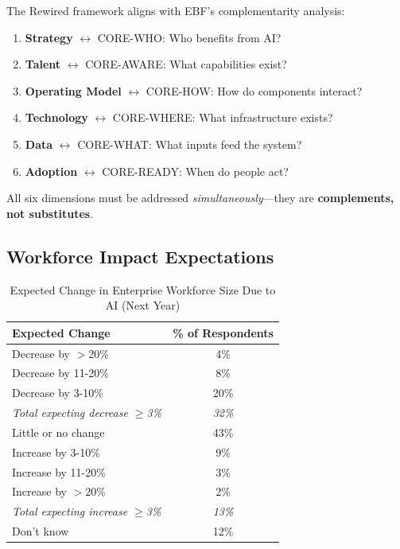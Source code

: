\begin{tcolorbox}[colback=blue!5!white, colframe=blue!75!black,
    title=The Six Complementary Dimensions]

The Rewired framework aligns with EBF's complementarity analysis:

\begin{enumerate}
\item \textbf{Strategy} $\leftrightarrow$ CORE-WHO: Who benefits from AI?
\item \textbf{Talent} $\leftrightarrow$ CORE-AWARE: What capabilities exist?
\item \textbf{Operating Model} $\leftrightarrow$ CORE-HOW: How do components interact?
\item \textbf{Technology} $\leftrightarrow$ CORE-WHERE: What infrastructure exists?
\item \textbf{Data} $\leftrightarrow$ CORE-WHAT: What inputs feed the system?
\item \textbf{Adoption} $\leftrightarrow$ CORE-READY: When do people act?
\end{enumerate}

All six dimensions must be addressed \textit{simultaneously}---they are \textbf{complements, not substitutes}.

\end{tcolorbox}


\subsection{Workforce Impact Expectations}

\begin{table}[htbp]
\centering
\caption{Expected Change in Enterprise Workforce Size Due to AI (Next Year)}
\label{tab:vvv1-workforce}
\renewcommand{\arraystretch}{1.3}
\begin{tabular}{@{}lc@{}}
\toprule
\textbf{Expected Change} & \textbf{\% of Respondents} \\
\midrule
Decrease by $>$20\% & 4\% \\
Decrease by 11-20\% & 8\% \\
Decrease by 3-10\% & 20\% \\
\textit{Total expecting decrease $\geq$3\%} & \textit{32\%} \\
\midrule
Little or no change & 43\% \\
\midrule
Increase by 3-10\% & 9\% \\
Increase by 11-20\% & 3\% \\
Increase by $>$20\% & 2\% \\
\textit{Total expecting increase $\geq$3\%} & \textit{13\%} \\
\midrule
Don't know & 12\% \\
\bottomrule
\end{tabular}
\end{table}


